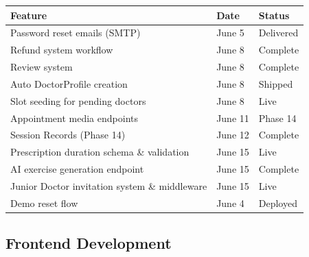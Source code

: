\documentclass[11pt,a4paper]{article}
\begin{document}
\begin{itemize}
{\begin{table}[h!]
\centering
\begin{tabularx}{\textwidth}{X l l}
\toprule
\textbf{Feature} & \textbf{Date} & \textbf{Status} \\
\midrule
Password reset emails (SMTP)      & June 5  & Delivered \\
Refund system workflow             & June 8  & Complete  \\
Review system                      & June 8  & Complete  \\
Auto DoctorProfile creation        & June 8  & Shipped   \\
Slot seeding for pending doctors   & June 8  & Live      \\
Appointment media endpoints        & June 11 & Phase 14  \\
Session Records (Phase 14)         & June 12 & Complete  \\
Prescription duration schema \& validation & June 15 & Live \\
AI exercise generation endpoint    & June 15 & Complete  \\
Junior Doctor invitation system \& middleware & June 15 & Live \\
Demo reset flow                    & June 4  & Deployed  \\
\bottomrule
\end{tabularx}
\end{table}

\subsection{Frontend Development}

}
\end{itemize}
\end{document}
